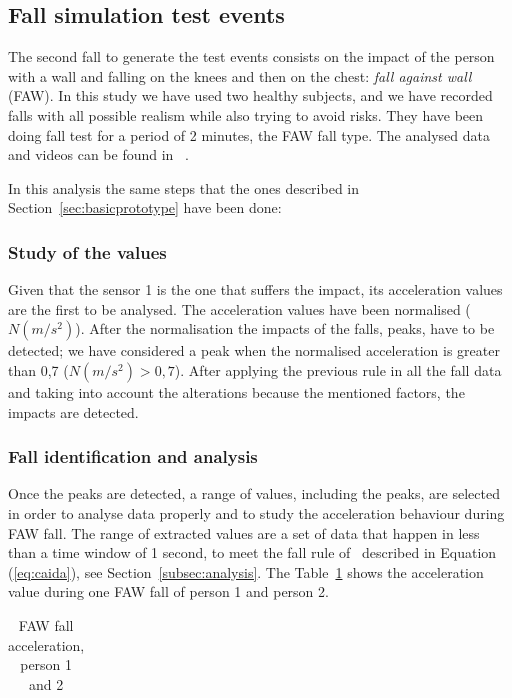 \documentclass[review]{elsarticle}
\begin{document}
\subsection{Fall simulation test events}

The second fall to generate the test events consists on the impact of the person with 
a wall and falling on the knees and then on the chest: \textit{fall against wall} (FAW). 
In this study we have used two healthy subjects, and we have recorded falls with all 
possible realism while also trying to avoid risks. They have been doing fall test for a period 
of 2 minutes, the FAW fall type. The analysed data and videos can be found in ~\cite{FallRepo}.

In this analysis the same steps that the ones described in Section~\ref{sec:basicprototype} 
have been done:

\subsubsection*{Study of the values} Given that the sensor 1 is the one that suffers the 
impact, its acceleration values are the first to be analysed. The acceleration values have 
been normalised ($N(m/s^2)$). After the normalisation the impacts of the falls, peaks, 
have to be detected; we have considered a peak when the normalised acceleration is 
greater than 0,7 ($N(m/s^2) > 0,7$). After applying the previous rule in all the fall data 
and taking into account the alterations because the mentioned factors, the impacts are detected.

\subsubsection*{Fall identification and analysis} Once the peaks are detected, a range of values, 
including the peaks, are selected in order to analyse data properly and to study the acceleration 
behaviour during FAW fall. The range of extracted values are a set of data that happen in less 
than a time window of 1 second, to meet the fall rule of~\cite{Luder2009} described in 
Equation (\ref{eq:caida}), see Section~\ref{subsec:analysis}. The Table~\ref{tabla:FAW} shows the 
acceleration value during one FAW fall of person 1 and person 2. 

\begin{table}[!ht]
 \centering
 \begin{tabular}{*{5}{r}}
   
 \end{tabular}
 \caption{FAW fall acceleration, person 1 and 2}%
 \label{tabla:FAW}
\end{table}
\end{document}
